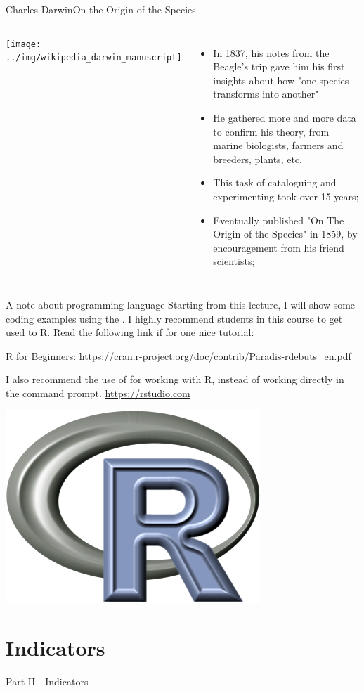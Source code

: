\begin{frame}{Charles Darwin}{On the Origin of the Species}
  \begin{columns}
    \texttt{[image: ../img/wikipedia\_darwin\_manuscript]}
  \begin{itemize}
    \item In 1837, his notes from the Beagle's trip gave him his first insights about how "one species transforms into another"
    \item He gathered more and more data to confirm his theory, from marine biologists, farmers and breeders, plants, etc.
    \item This task of cataloguing and experimenting took over 15 years;
    \item Eventually published "On The Origin of the Species" in 1859, by encouragement from his friend scientists;
  \end{itemize}
  \end{columns}
\end{frame}

\begin{frame}{A note about programming language}
  Starting from this lecture, I will show some coding examples using the . I highly recommend students in this course to get used to R. Read the following link if for one nice tutorial:\bigskip

  R for Beginners: \url{https://cran.r-project.org/doc/contrib/Paradis-rdebuts_en.pdf}\bigskip

  I also recommend the use of  for working with R, instead of working directly in the command prompt. \url{https://rstudio.com}
  \vfill

  \hfill\includegraphics[width=.2\textwidth]{../img/Rlogo}
\end{frame}


\section{Indicators}
\begin{frame}
  \begin{center}
    Part II - Indicators
  \end{center}
\end{frame}

